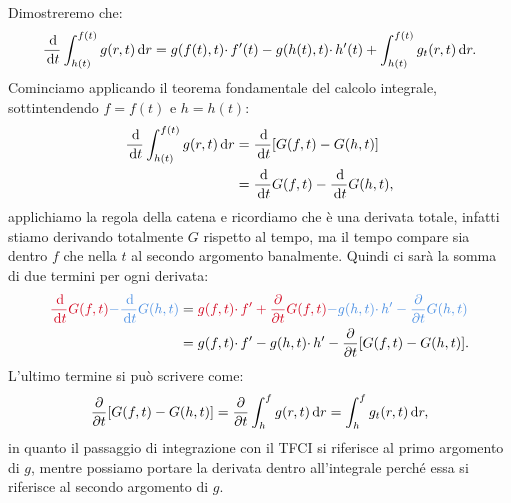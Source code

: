 \begin{nb}
    Dimostreremo che:
    \begin{equation*}
        \frac{\,\mathrm d}{\,\mathrm d t}\int _{h(t)}^{f(t)} g(r,t) \,\mathrm d r=g(f(t) ,t) \cdotp f'(t) -g(h(t) ,t) \cdotp h'(t) +\int _{h(t)}^{f(t)} g_{t}(r,t) \,\mathrm d r.
    \end{equation*}
    Cominciamo applicando il teorema fondamentale del calcolo integrale, sottintendendo $f=f(t)$ e $h=h(t)$:
    \begin{align*}
        \frac{\,\mathrm d}{\,\mathrm d t}\int _{h(t)}^{f(t)} g(r,t) \,\mathrm d r & =\frac{\,\mathrm d}{\,\mathrm d t}[ G(f,t) -G(h,t)]                 \\
                                                      & =\frac{\,\mathrm d}{\,\mathrm d t} G(f,t) -\frac{\,\mathrm d}{\,\mathrm d t} G(h,t) ,
    \end{align*}
    applichiamo la regola della catena e ricordiamo che è una derivata totale, infatti stiamo derivando totalmente $G$ rispetto al tempo, ma il tempo compare sia dentro $f$ che nella $t$ al secondo argomento banalmente. Quindi ci sarà la somma di due termini per ogni derivata:
    \begin{align*}
        \textcolor[rgb]{0.82,0.01,0.11}{\frac{\de}{\dt} G(f,t)}\textcolor[rgb]{0.29,0.56,0.89}{-\frac{\de}{\dt} G(h,t)} & =\textcolor[rgb]{0.82,0.01,0.11}{g(f,t) \cdotp f'+\frac{\partial }{\partial t} G(f,t)}\textcolor[rgb]{0.29,0.56,0.89}{-g(h,t) \cdotp h'-\frac{\partial }{\partial t} G(h,t)} \\
                                                                                                                        & =g(f,t) \cdotp f'-g(h,t) \cdotp h'-\frac{\partial }{\partial t}[ G(f,t) -G(h,t)] .
    \end{align*}
    L'ultimo termine si può scrivere come:
    \begin{equation*}
        \frac{\partial }{\partial t}[ G(f,t) -G(h,t)] =\frac{\partial }{\partial t}\int _{h}^{f} g(r,t) \,\mathrm d r=\int _{h}^{f} g_{t}(r,t) \,\mathrm d r,
    \end{equation*}
    in quanto il passaggio di integrazione con il TFCI si riferisce al primo argomento di $g$, mentre possiamo portare la derivata dentro all'integrale perché essa si riferisce al secondo argomento di $g$.
\end{nb}
